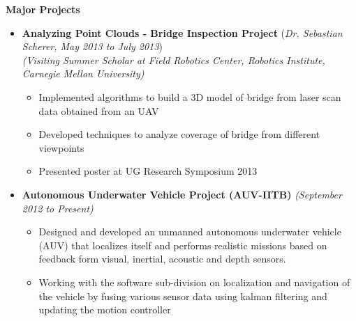 \documentclass[a4paper,10pt]{article}
\newcommand{\isep}{-2 pt}
\newcommand{\resheading}[1]{{\small \colorbox{mygrey}{\begin{minipage}{0.975\textwidth}{\textbf{#1 \vphantom{p\^{E}}}}\end{minipage}}}}
\begin{document}
\resheading{\textbf{\large{Major Projects}}}
\begin{itemize}
    \item \textbf{Analyzing Point Clouds - Bridge Inspection Project} \hfill (\emph{Dr. Sebastian Scherer, May 2013 to July 2013}) \\
        \emph{(Visiting Summer Scholar at Field Robotics Center, Robotics Institute, Carnegie Mellon University)} \\[-0.6cm]
        \begin{itemize} \itemsep \isep
            \item Implemented algorithms to build a 3D model of bridge from laser scan data obtained from an UAV
            \item Developed techniques to analyze coverage of bridge from different viewpoints
            \item Presented poster at UG Research Symposium 2013
        \end{itemize}
        
    \item \textbf{Autonomous Underwater Vehicle Project (AUV-IITB)} \hfill \emph{(September 2012 to Present) } \\[-0.6cm]
    \begin{itemize} \itemsep \isep
        \item Designed and developed an unmanned autonomous underwater vehicle (AUV) that localizes itself and performs realistic missions based on feedback form visual, inertial, acoustic and depth sensors. 
        \item Working with the software sub-division on localization and navigation of the vehicle  by fusing various sensor data using kalman filtering and updating the motion controller \\[-0.6cm]
    \end{itemize}
    \begin{comment}
    \item \textbf{ High Level Synthesis using Legup} \hfill \emph{(Guided by Prof. S. Patkar, September 2012 to Present) }  \\[-0.6cm]
    \begin{itemize} \itemsep \isep 
        \item Working under High Power Computing Lab, EE Dept. on HLS to implement a memory model using stacks or queues to improve the synthesis of specific applications with regular and iterative 
        \item Building up on legup infrastructure to analyze different high level synthesis techniques
        \end{itemize}
    \end{comment}



\end{itemize}
\end{document}
